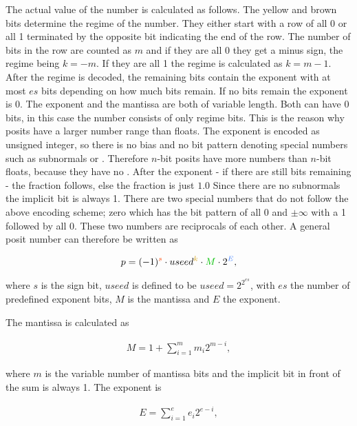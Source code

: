 \documentclass{article}
\theoremstyle{plain} %
\theoremstyle{convention} %
\theoremstyle{remark} %
\numberwithin{equation}{section}
\begin{document}
The actual value of the number is calculated as follows. The yellow and brown bits determine the regime of the number. They either start with a \textcolor{cyellow}{row of all \num{0} or all \num{1}} terminated by the \textcolor{cbrown}{opposite bit} indicating the end of the row. The number of bits in the row are counted as $m$ and if they are all \num{0} they get a minus sign, the regime being $k=-m$. If they are all \num{1} the regime is calculated as $k=m-1$. After the regime is decoded, the remaining bits contain the exponent with at most $es$ bits depending on how much bits remain. If no bits remain the exponent is \num{0}. The exponent and the mantissa are both of variable length. Both can have \num{0} bits, in this case the number consists of only regime bits. This is the reason why posits have a larger number range than floats. The exponent is encoded as unsigned integer, so there is no bias and no bit pattern denoting special numbers such as subnormals or . Therefore $n$-bit posits have more numbers than $n$-bit floats, because they have no . After the exponent - if there are still bits remaining - the fraction follows, else the fraction is just $1.0$ Since there are no subnormals the implicit bit is always \num{1}. There are two special numbers that do not follow the above encoding scheme; zero which has the bit pattern of all \num{0} and $\pm \infty$ with a \num{1} followed by all \num{0}. These two numbers are reciprocals of each other. A general posit number can therefore be written as

\begin{align*}
    p = (-1)^{\textcolor{corange}{s}} \cdot useed^{\textcolor{cyellow}{k}} \cdot \textcolor{cgreen}{M} \cdot 2^{\textcolor{cblue}{E}},
\end{align*}

where $s$ is the sign bit, $useed$ is defined to be $useed = 2^{2^{es}}$, with $es$ the number of predefined exponent bits, $M$ is the mantissa and $E$ the exponent.

The mantissa is calculated as

\begin{align*}
    M = 1 + \sum_{i=1}^{m} m_{i} 2^{m-i},
\end{align*}

where $m$ is the variable number of mantissa bits and the implicit bit in front of the sum is always \num{1}. The exponent is

\begin{align*}
    E = \sum_{i=1}^{e} e_{i} 2^{e-i},
\end{align*}
\end{document}

